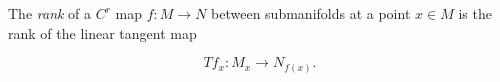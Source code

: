 The \textit{rank} of a $C^r$ map $f: M \to N$ between submanifolds at a point $x \in M$ is the rank of the linear tangent map

$$Tf_x: M_x \to N_{f(x)}.$$

